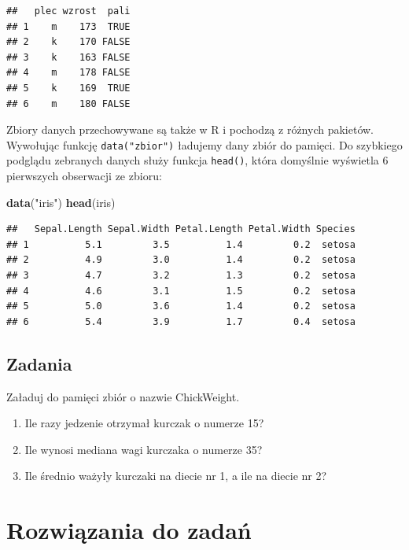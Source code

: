 \documentclass[]{book}
\newenvironment{Shaded}{\begin{snugshade}}{\end{snugshade}}
\newcommand{\KeywordTok}[1]{\textcolor[rgb]{0.13,0.29,0.53}{\textbf{#1}}}
\newcommand{\StringTok}[1]{\textcolor[rgb]{0.31,0.60,0.02}{#1}}
\newcommand{\NormalTok}[1]{#1}
\providecommand{\tightlist}{%
  \setlength{\itemsep}{0pt}\setlength{\parskip}{0pt}}
\begin{document}
\begin{verbatim}
##   plec wzrost  pali
## 1    m    173  TRUE
## 2    k    170 FALSE
## 3    k    163 FALSE
## 4    m    178 FALSE
## 5    k    169  TRUE
## 6    m    180 FALSE
\end{verbatim}

Zbiory danych przechowywane są także w R i pochodzą z różnych pakietów.
Wywołując funkcję \texttt{data("zbior")} ładujemy dany zbiór do pamięci.
Do szybkiego podglądu zebranych danych służy funkcja \texttt{head()},
która domyślnie wyświetla 6 pierwszych obserwacji ze zbioru:

\begin{Shaded}
\begin{Highlighting}[]
\KeywordTok{data}\NormalTok{(}\StringTok{"iris"}\NormalTok{)}
\KeywordTok{head}\NormalTok{(iris)}
\end{Highlighting}
\end{Shaded}

\begin{verbatim}
##   Sepal.Length Sepal.Width Petal.Length Petal.Width Species
## 1          5.1         3.5          1.4         0.2  setosa
## 2          4.9         3.0          1.4         0.2  setosa
## 3          4.7         3.2          1.3         0.2  setosa
## 4          4.6         3.1          1.5         0.2  setosa
## 5          5.0         3.6          1.4         0.2  setosa
## 6          5.4         3.9          1.7         0.4  setosa
\end{verbatim}

\subsection{Zadania}\label{zadania-1}

Załaduj do pamięci zbiór o nazwie ChickWeight.

\begin{enumerate}
\def\labelenumi{\arabic{enumi}.}
\tightlist
\item
  Ile razy jedzenie otrzymał kurczak o numerze 15?
\item
  Ile wynosi mediana wagi kurczaka o numerze 35?
\item
  Ile średnio ważyły kurczaki na diecie nr 1, a ile na diecie nr 2?
\end{enumerate}

\section{Rozwiązania do zadań}\label{rozwiazania-do-zadan}
\end{document}
